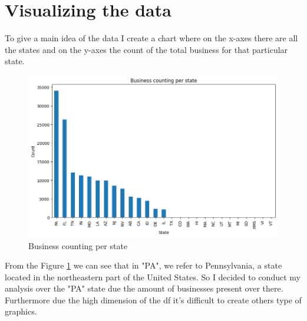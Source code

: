 \documentclass[12pt,english]{report}
\begin{document}
\section{Visualizing the data}\label{sec:visdata}
To give a main idea of the data I create a chart where on the x-axes there are all the states and on the y-axes the count of the total business for that particular state. 
\begin{figure}[hbtp]
\caption{Business counting per state}
\label{fig:buscount}
\centering
\includegraphics[scale=0.5]{../Images/dataexp.png}
\end{figure}
From the Figure \ref{fig:buscount} we can see that in "PA", we refer to Pennsylvania, a state located in the northeastern part of the United States. So I decided to conduct my analysis over the "PA" state due the amount of businesses present over there. Furthermore due the high dimension of the df it's difficult to create others type of graphics.
\end{document}
